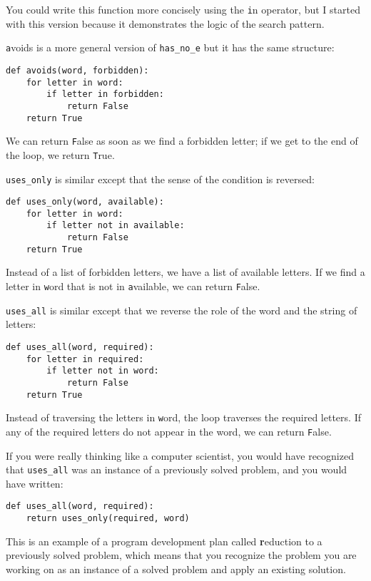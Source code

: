 \documentclass[
DIV=11,
fontsize=12,
twoside,
headinclude=false,
titlepage=firstiscover,
abstract=true,
headsepline=true,
footsepline=true,
chapterprefix=true, %
headings=big,
bibliography=totoc,%
captions=tableheading
]{scrbook}
\theoremstyle{definition}
\begin{document}
You could write this function more concisely using the {\texttt in}
operator, but I started with this version because it 
demonstrates the logic of the search pattern.

{\texttt avoids} is a more general version of \verb"has_no_e" but it
has the same structure:

\begin{lstlisting}
def avoids(word, forbidden):
    for letter in word:
        if letter in forbidden:
            return False
    return True
\end{lstlisting}
%
We can return {\texttt False} as soon as we find a forbidden letter;
if we get to the end of the loop, we return {\texttt True}.

\verb"uses_only" is similar except that the sense of the condition
is reversed:

\begin{lstlisting}
def uses_only(word, available):
    for letter in word: 
        if letter not in available:
            return False
    return True
\end{lstlisting}
%
Instead of a list of forbidden letters, we have a list of available
letters.  If we find a letter in {\texttt word} that is not in
{\texttt available}, we can return {\texttt False}.

\verb"uses_all" is similar except that we reverse the role
of the word and the string of letters:

\begin{lstlisting}
def uses_all(word, required):
    for letter in required: 
        if letter not in word:
            return False
    return True
\end{lstlisting}
%
Instead of traversing the letters in {\texttt word}, the loop
traverses the required letters.  If any of the required letters
do not appear in the word, we can return {\texttt False}.

If you were really thinking like a computer scientist, you would
have recognized that \verb"uses_all" was an instance of a
previously solved problem, and you would have written:

\begin{lstlisting}
def uses_all(word, required):
    return uses_only(required, word)
\end{lstlisting}
%
This is an example of a program development plan called {\textbf
  reduction to a previously solved problem}, which means that you
recognize the problem you are working on as an instance of a solved
problem and apply an existing solution.   
\end{document}
